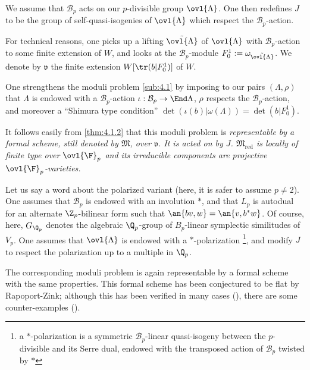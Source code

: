 \begin{para}\label{para:4.3.2} We assume that $\mathcal{B}_p$ acts on our
 $p$-divisible group $\ovl{\Lambda}$. One then redefines $J$ to 
be the group of self-quasi-isogenies of $\ovl{\Lambda}$ which respect
the $\mathcal{B}_p$-action.


For technical reasons, one picks up a lifting $\tilde{\ovl{\Lambda}}$ of
$\ovl{\Lambda}$ with $\mathcal{B}_p$-action to some finite extension of
$W$, and looks at the $\mathcal{B}_p$-module
$F^1_0:=\omega_{\tilde{\ovl{\Lambda}}}$. We denote by $\mathfrak{v}$ the
finite extension $W[\tr(b| F^1_0)]$ of $W$.


One strengthens the moduli problem \ref{sub:4.1} by imposing to our pairs
 $(\Lambda,\rho)$ that $\Lambda$ is endowed with a
 $\mathcal{B}_p$-action $\iota:\mathcal{B}_p\rightarrow \End \Lambda$,
 $\rho$ respects the $\mathcal{B}_p$-action, and moreover a ``Shimura
 type condition'' $\det(\iota(b)| \omega(\Lambda))=\det(b|
 F^1_0)$.

 It follows easily from \ref{thm:4.1.2} \cite[3.25]{psfpg} that this
 moduli problem is {\it representable by a formal scheme, still denoted
 by $\mathfrak{M}$, over $\mathfrak{v}$. It is acted on by
 $J$. $\mathfrak{M}_{\mathrm{red}}$ is locally of finite type over ${\ovl{\F}}_p$
 and its irreducible components are projective
 ${\ovl{\F}}_p$-varieties. }
\end{para}

\begin{para}\label{para:4.3.3} Let us say a word about the polarized variant
 (here, it is safer to assume $p\neq 2$). One assumes 
 that $\mathcal{B}_p$ is endowed with an involution $\ast$, and that
 $L_p$ is autodual for an alternate $\Z_p$-bilinear form such that
 $\an{bv,w}=\an{v,b^\ast w}$. Of course, here, $G_{\Q_p}$ denotes the algebraic
 $\Q_p$-group of $B_p$-linear symplectic similitudes of $V_p$. One
 assumes that $\ovl{\Lambda}$ is endowed with a $\ast$-polarization
 \footnote{a $\ast$-polarization is a symmetric
 $\mathcal{B}_p$-linear quasi-isogeny between the $p$-divisible and its
 Serre dual, endowed with the transposed action of $\mathcal{B}_p$
 twisted by $\ast$}, and modify $J$ to respect the polarization up to a
 multiple in $\Q_p$.
 
 \bigskip
 The corresponding moduli problem is again representable by a formal
 scheme with the same properties. This formal scheme has been conjectured to be flat by Rapoport-Zink; although this has been verified in many cases (\cf \eg \cite{gortz}), there are some counter-examples  (\cf  \cite{pappas}).
\end{para}

